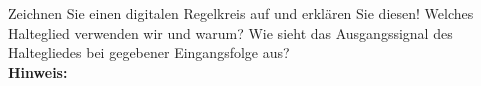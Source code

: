\begin{question}[section=6,subsection=,name={Digitaler Regelkreis},difficulty=,type=mdl,tags={}]
	Zeichnen Sie einen digitalen Regelkreis auf und erklären Sie diesen! Welches Halteglied verwenden wir und warum? Wie sieht das Ausgangssignal des Haltegliedes bei gegebener Eingangsfolge aus?
	\\ \textbf{Hinweis:}\\
	
\end{question}
\begin{solution}
	
\end{solution}
